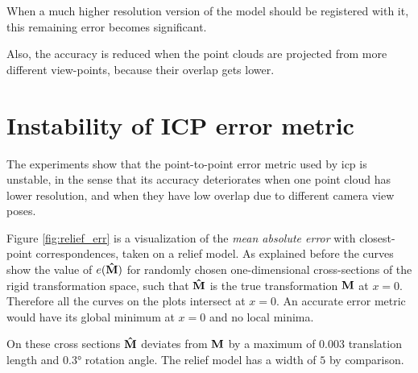 When a much higher resolution version of the model should be registered with it, this remaining error becomes significant.

Also, the accuracy is reduced when the point clouds are projected from more different view-points, because their overlap gets lower.


\section{Instability of ICP error metric}
The experiments show that the point-to-point error metric used by \gls{icp} is unstable, in the sense that its accuracy deteriorates when one point cloud has lower resolution, and when they have low overlap due to different camera view poses.

Figure \ref{fig:relief_err} is a visualization of the \emph{mean absolute error} with closest-point correspondences, taken on a relief model. As explained before the curves show the value of $e(\mathbf{\hat{M}})$ for randomly chosen one-dimensional cross-sections of the rigid transformation space, such that $\mathbf{\hat{M}}$ is the true transformation $\mathbf{M}$ at $x = 0$. Therefore all the curves on the plots intersect at $x = 0$. An accurate error metric would have its global minimum at $x = 0$ and no local minima.

On these cross sections $\mathbf{\hat{M}}$ deviates from $\mathbf{M}$ by a maximum of $0.003$ translation length and $0.3\si{\degree}$ rotation angle. The relief model has a width of $5$ by comparison.

